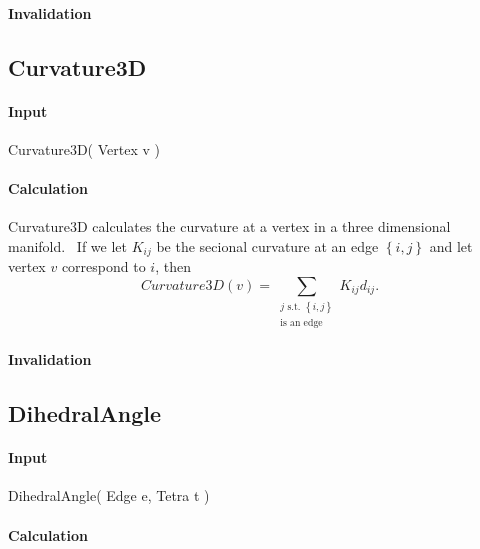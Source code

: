 \paragraph{Invalidation}

\bigskip

\subsection{Curvature3D}

\paragraph{Input}

Curvature3D( Vertex v )

\paragraph{Calculation}

Curvature3D calculates the curvature at a vertex in a three dimensional
manifold. \ If we let $K_{ij}$ be the secional curvature at an edge $\left\{
i,j\right\} $ and let vertex $v$ correspond to $i$, then%
\begin{equation*}
Curvature3D\left( v\right) =\sum\limits_{\substack{ j\text{ s.t. }\left\{
i,j\right\}  \\ \text{is an edge}}}K_{ij}d_{ij}.
\end{equation*}

\paragraph{Invalidation}

\bigskip

\subsection{DihedralAngle}

\paragraph{Input}

DihedralAngle( Edge e, Tetra t )

\paragraph{Calculation}

